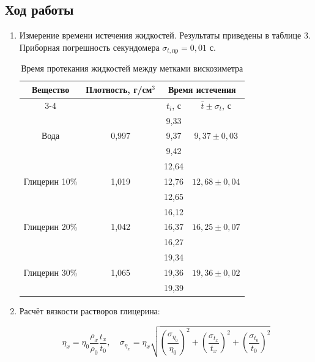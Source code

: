 \documentclass[a4paper]{article}
\begin{document}
\subsection{Ход работы}
\begin{enumerate}
    \item Измерение времени истечения жидкостей. Результаты приведены в таблице 3. Приборная погрешность секундомера $\sigma_{t,\text{пр}} = 0,01$ с.

    \begin{table}[h]
        \centering
        \caption{Время протекания жидкостей между метками вискозиметра}
        \label{tab:ostwald}
        \begin{tabular}{|c|c|c|c|}
        \hline
        \multirow{2}{*}{Вещество} & \multirow{2}{*}{Плотность, г/см$^3$} & \multicolumn{2}{c|}{Время истечения} \\ \cline{3-4}
         & & $t_i$, с & $\bar t \pm \sigma_t$, с \\
        \hline
        \multirow{3}{*}{Вода} & \multirow{3}{*}{0,997} & 9,33 & \multirow{3}{*}{$9,37 \pm 0,03$} \\
         & & 9,37 & \\
         & & 9,42 & \\
        \hline
        \multirow{3}{*}{Глицерин 10\%} & \multirow{3}{*}{1,019} & 12,64 & \multirow{3}{*}{$12,68 \pm 0,04$} \\
         & & 12,76 & \\
         & & 12,65 & \\
        \hline
        \multirow{3}{*}{Глицерин 20\%} & \multirow{3}{*}{1,042} & 16,12 & \multirow{3}{*}{$16,25 \pm 0,07$} \\
         & & 16,37 & \\
         & & 16,27 & \\
        \hline
        \multirow{3}{*}{Глицерин 30\%} & \multirow{3}{*}{1,065} & 19,34 & \multirow{3}{*}{$19,36 \pm 0,02$} \\
         & & 19,36 & \\
         & & 19,39 & \\
        \hline
        \end{tabular}
    \end{table}

    \item Расчёт вязкости растворов глицерина:
    
    $$\eta_x = \eta_0\frac{\rho_x}{\rho_0}\frac{t_x}{t_0}, \quad 
    \sigma_{\eta_x} = \eta_x \sqrt{\left(\frac{\sigma_{\eta_0}}{\eta_0}\right)^2 + \left(\frac{\sigma_{t_x}}{t_x}\right)^2 + \left(\frac{\sigma_{t_0}}{t_0}\right)^2}$$
    

\end{enumerate}
\end{document}
